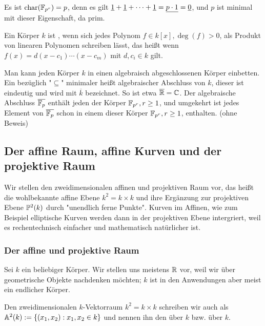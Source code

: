 \begin{bem}
	Es ist $\operatorname{char}(\mathbb{F}_{p^r}) = p$, denn es gilt $\uline{1} + \uline{1} + \dots + \uline{1} = \uline{p \cdot 1} = \uline{0}$, und $p$ ist minimal mit dieser Eigenschaft, da prim.
\end{bem}

\begin{defn}
	Ein Körper $k$ ist , wenn sich jedes Polynom $f \in k[x], \deg(f) > 0$, als Produkt von linearen Polynomen schreiben lässt, das heißt wenn $f(x) = d(x-c_1) \cdots (x-c_m)$ mit $d,c_i \in k$ gilt.
\end{defn}

\begin{bem}
\label{bem_7.22}
	Man kann jeden Körper $k$ in einen algebraisch abgeschlossenen Körper einbetten. Ein bezüglich "$\subseteq$" minimaler heißt algebraischer Abschluss von $k$, dieser ist eindeutig und wird mit $\overline{k}$ bezeichnet. So ist etwa $\overline{\mathbb{R}} = \mathbb{C}$. Der algebraische Abschluss $\overline{\mathbb{F}_p}$ enthält jeden der Körper $\mathbb{F}_{p^r}, r \geq 1$, und umgekehrt ist jedes Element von $\overline{\mathbb{F}_p}$ schon in einem dieser Körper $\mathbb{F}_{p^r}, r \geq 1$, enthalten. (ohne Beweis)
\end{bem}

\nextlecture
\newpage
\subsection{Der affine Raum, affine Kurven und der projektive Raum}
	Wir stellen den zweidimensionalen affinen und projektiven Raum vor,\marginnote{[8]} das heißt die wohlbekannte affine Ebene $k^2 = k \times k$ und ihre Ergänzung zur projektiven Ebene $\mathbb{P}^2(k)$ durch "unendlich ferne Punkte". Kurven im Affinen, wie zum Beispiel elliptische Kurven werden dann in der projektiven Ebene intergriert, weil es rechentechnisch einfacher und mathematisch natürlicher ist.
	
\subsubsection{Der affine und projektive Raum}
	Sei $k$ ein beliebiger Körper. Wir stellen uns meistens $\mathbb{R}$ vor, weil wir über geometrische Objekte nachdenken möchten; $k$ ist in den Anwendungen aber meist ein endlicher Körper.

\begin{defn}
	Den zweidimensionalen $k$-Vektorraum $k^2 = k \times k$ schreiben wir auch als $\mathbb{A}^2(k) := \{(x_1,x_2) : x_1,x_2 \in k\}$ und nennen ihn den  über $k$ bzw.  über $k$. 
\end{defn}

